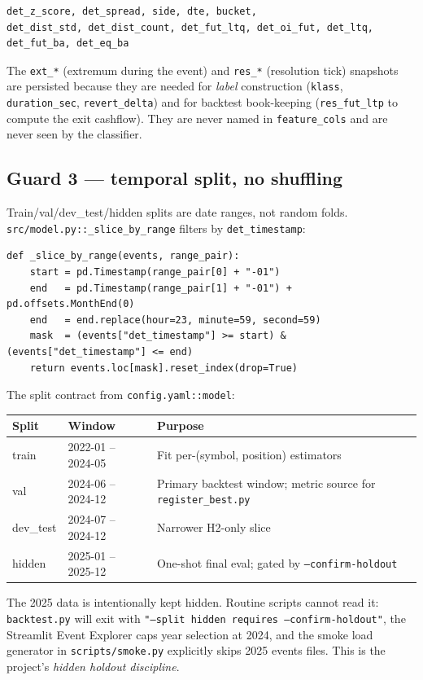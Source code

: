 \documentclass[11pt,a4paper]{article}
\begin{document}
\begin{lstlisting}[style=bashstyle]
det_z_score, det_spread, side, dte, bucket,
det_dist_std, det_dist_count, det_fut_ltq, det_oi_fut, det_ltq,
det_fut_ba, det_eq_ba
\end{lstlisting}

The \texttt{ext\_*} (extremum during the event) and \texttt{res\_*} (resolution tick) snapshots are persisted because they are needed for \emph{label} construction (\texttt{klass}, \texttt{duration\_sec}, \texttt{revert\_delta}) and for backtest book-keeping (\texttt{res\_fut\_ltp} to compute the exit cashflow). They are never named in \texttt{feature\_cols} and are never seen by the classifier.

\subsection{Guard 3 --- temporal split, no shuffling}
Train/val/dev\_test/hidden splits are date ranges, not random folds. \texttt{src/model.py::\_slice\_by\_range} filters by \texttt{det\_timestamp}:

\begin{lstlisting}[style=pystyle]
def _slice_by_range(events, range_pair):
    start = pd.Timestamp(range_pair[0] + "-01")
    end   = pd.Timestamp(range_pair[1] + "-01") + pd.offsets.MonthEnd(0)
    end   = end.replace(hour=23, minute=59, second=59)
    mask  = (events["det_timestamp"] >= start) & (events["det_timestamp"] <= end)
    return events.loc[mask].reset_index(drop=True)
\end{lstlisting}

The split contract from \texttt{config.yaml::model}:

\begin{tabularx}{\linewidth}{@{}llX@{}}
\toprule
\textbf{Split} & \textbf{Window} & \textbf{Purpose} \\
\midrule
train     & 2022-01 -- 2024-05 & Fit per-(symbol, position) estimators \\
val       & 2024-06 -- 2024-12 & Primary backtest window; metric source for \texttt{register\_best.py} \\
dev\_test & 2024-07 -- 2024-12 & Narrower H2-only slice \\
hidden    & 2025-01 -- 2025-12 & One-shot final eval; gated by \texttt{--confirm-holdout} \\
\bottomrule
\end{tabularx}

The 2025 data is intentionally kept hidden. Routine scripts cannot read it: \texttt{backtest.py} will exit with \texttt{"--split hidden requires --confirm-holdout"}, the Streamlit Event Explorer caps year selection at 2024, and the smoke load generator in \texttt{scripts/smoke.py} explicitly skips 2025 events files. This is the project's \emph{hidden holdout discipline}.
\end{document}

